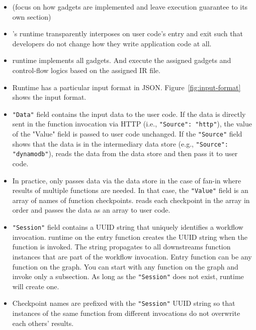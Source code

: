 \begin{itemize}

    \item (focus on how gadgets are implemented and leave execution guarantee
    to its own section)

    \item \name{}'s runtime transparently interposes on user code's entry and
    exit such that developers do not change how they write application code at all.

    \item \name{} runtime implements all gadgets. And execute the assigned
    gadgets and control-flow logics based on the assigned IR file.

    \item Runtime has a particular input format in JSON.
    Figure~\ref{fig:input-format} shows the input format.

    \item \texttt{"Data"} field contains the input data to the user code. If
    the data is directly sent in the function invocation via HTTP (i.e.,
    \texttt{"Source": "http"}), the value of the "Value" field is passed to
    user code unchanged. If the \texttt{"Source"} field shows that the data is
    in the intermediary data store (e.g., \texttt{"Source": "dynamodb"}),
    \name{} reads the data from the data store and then pass it to user code.

    \item In practice, \name{} only passes data via the data store in the case
    of fan-in where results of multiple functions are needed. In that case,
    the \texttt{"Value"} field is an array of names of function checkpoints.
    \name{} reads each checkpoint in the array in order and passes the data as
    an array to user code.

    \item \texttt{"Session"} field contains a UUID string that uniquely
    identifies a workflow invocation. \name{} runtime on the entry function
    creates the UUID string when the function is invoked. The string
    propagates to all downstreams function instances that are part of the
    workflow invocation. Entry function can be any function on the graph. You
    can start with any function on the graph and invoke only a subsection. As
    long as the \texttt{"Session"} does not exist, \name{} runtime will create
    one.

    \item Checkpoint names are prefixed with the \texttt{"Session"} UUID
    string so that instances of the same function from different invocations
    do not overwrite each others' results.


\end{itemize}
